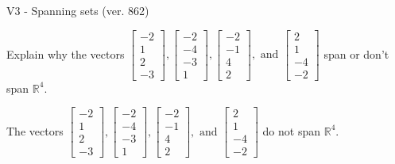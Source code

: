 \begin{exercise}
  \begin{exerciseTitle}V3 - Spanning sets (ver. 862)\end{exerciseTitle}
  \begin{exerciseStatement}
    Explain why the vectors \(\left[\begin{array}{r}
-2 \\
1 \\
2 \\
-3
\end{array}\right] , \left[\begin{array}{r}
-2 \\
-4 \\
-3 \\
1
\end{array}\right] , \left[\begin{array}{r}
-2 \\
-1 \\
4 \\
2
\end{array}\right] , \text{ and } \left[\begin{array}{r}
2 \\
1 \\
-4 \\
-2
\end{array}\right]\) span or don't span \(\mathbb{R}^4\). 
	


  \end{exerciseStatement}
  \begin{exerciseAnswer}
   The vectors \(\left[\begin{array}{r}
-2 \\
1 \\
2 \\
-3
\end{array}\right] , \left[\begin{array}{r}
-2 \\
-4 \\
-3 \\
1
\end{array}\right] , \left[\begin{array}{r}
-2 \\
-1 \\
4 \\
2
\end{array}\right] , \text{ and } \left[\begin{array}{r}
2 \\
1 \\
-4 \\
-2
\end{array}\right]\) 
  	 do not  
	span \(\mathbb{R}^4\).
  


  \end{exerciseAnswer}
\end{exercise}